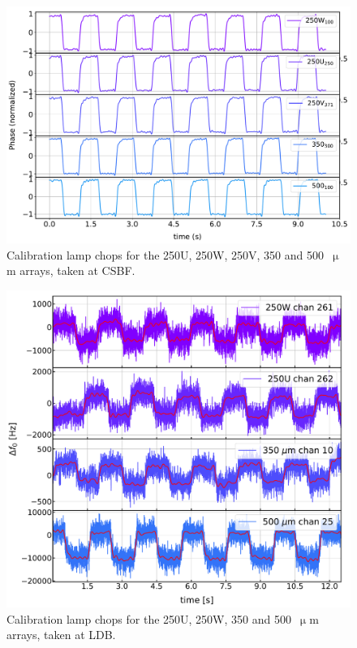 \begin{figure}[!htbp]
\centering
\includegraphics[width=\textwidth]{figures/blast_data/timestreams/cal_lamp_chops}
\caption[~Calibration lamp chops for the 250U, 250W, 250V, 350 and 500~ arrays, taken at CSBF.]{Calibration lamp chops for the 250U, 250W, 250V, 350 and 500~$\upmu$m arrays, taken at CSBF.}
\label{fig:cal lamp pal}
\end{figure}

\begin{figure}[!htbp]
\centering
\includegraphics[width=\textwidth]{figures/blast_data/timestreams/ice_lamps}
\caption[Calibration lamp chops for the 250U, 250W, 350 and 500~ arrays, taken at LDB.]{Calibration lamp chops for the 250U, 250W, 350 and 500~$\upmu$m arrays, taken at LDB.}
\label{fig:cal lamp ice}
\end{figure}

